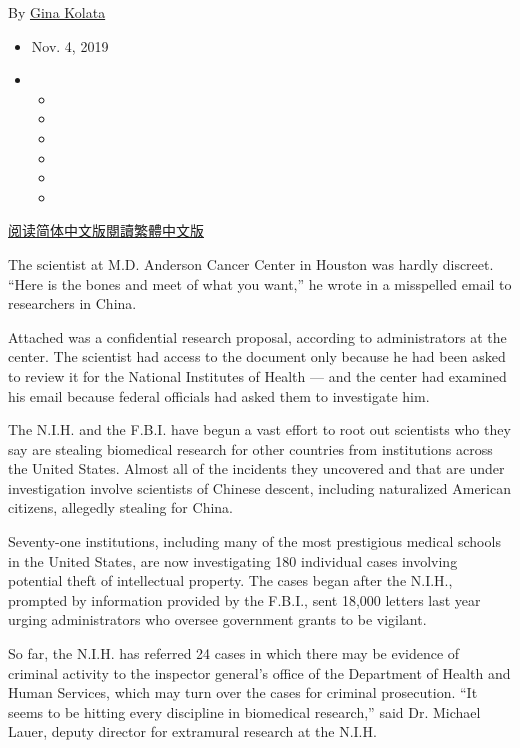 By \href{https://www.nytimes3xbfgragh.onion/by/gina-kolata}{Gina Kolata}

\begin{itemize}
\item
  Nov. 4, 2019
\item
  \begin{itemize}
  \item
  \item
  \item
  \item
  \item
  \item
  \end{itemize}
\end{itemize}

\href{https://cn.nytimes3xbfgragh.onion/usa/20191105/china-nih-scientists/}{阅读简体中文版}\href{https://cn.nytimes3xbfgragh.onion/usa/20191105/china-nih-scientists/zh-hant/}{閱讀繁體中文版}

The scientist at M.D. Anderson Cancer Center in Houston was hardly
discreet. ``Here is the bones and meet of what you want,'' he wrote in a
misspelled email to researchers in China.

Attached was a confidential research proposal, according to
administrators at the center. The scientist had access to the document
only because he had been asked to review it for the National Institutes
of Health --- and the center had examined his email because federal
officials had asked them to investigate him.

The N.I.H. and the F.B.I. have begun a vast effort to root out
scientists who they say are stealing biomedical research for other
countries from institutions across the United States. Almost all of the
incidents they uncovered and that are under investigation involve
scientists of Chinese descent, including naturalized American citizens,
allegedly stealing for China.

Seventy-one institutions, including many of the most prestigious medical
schools in the United States, are now investigating 180 individual cases
involving potential theft of intellectual property. The cases began
after the N.I.H., prompted by information provided by the F.B.I., sent
18,000 letters last year urging administrators who oversee government
grants to be vigilant.

So far, the N.I.H. has referred 24 cases in which there may be evidence
of criminal activity to the inspector general's office of the Department
of Health and Human Services, which may turn over the cases for criminal
prosecution. ``It seems to be hitting every discipline in biomedical
research,'' said Dr. Michael Lauer, deputy director for extramural
research at the N.I.H.

